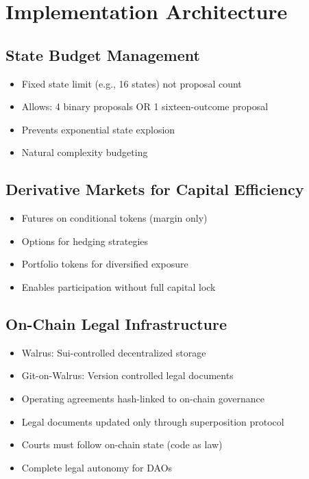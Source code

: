 \documentclass{article}
\begin{document}
\section{Implementation Architecture}
\subsection{State Budget Management}
\begin{itemize}
    \item Fixed state limit (e.g., 16 states) not proposal count
    \item Allows: 4 binary proposals OR 1 sixteen-outcome proposal
    \item Prevents exponential state explosion
    \item Natural complexity budgeting
\end{itemize}

\subsection{Derivative Markets for Capital Efficiency}
\begin{itemize}
    \item Futures on conditional tokens (margin only)
    \item Options for hedging strategies
    \item Portfolio tokens for diversified exposure
    \item Enables participation without full capital lock
\end{itemize}

\subsection{On-Chain Legal Infrastructure}
\begin{itemize}
    \item Walrus: Sui-controlled decentralized storage
    \item Git-on-Walrus: Version controlled legal documents
    \item Operating agreements hash-linked to on-chain governance
    \item Legal documents updated only through superposition protocol
    \item Courts must follow on-chain state (code as law)
    \item Complete legal autonomy for DAOs
\end{itemize}
\end{document}
